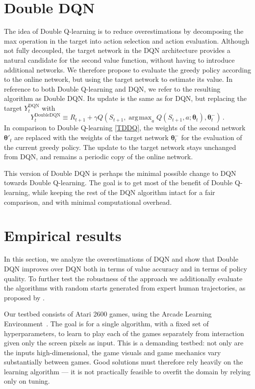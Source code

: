 \documentclass[letterpaper]{article}
\def\th{\bm\theta}
\def\g{\gamma}
\DeclareMathOperator*{\argmax}{\arg\!\max}
\begin{document}
\section{Double DQN}

The idea of Double Q-learning is to reduce overestimations by decomposing the max operation 
in the target into action selection and action evaluation.
Although not fully decoupled, the target network in the DQN architecture provides a natural candidate for the second value function, without having to introduce additional networks. 
We therefore propose to evaluate the greedy policy according to the online network, but using the target network to estimate its value.
In reference to both Double Q-learning and DQN, we refer to the resulting algorithm as Double DQN. 
Its update is the same as for DQN, but replacing the target $Y^{\text{DQN}}_t$ with
\[
Y^\text{DoubleDQN}_t \equiv R_{t+1} + \g Q( S_{t+1}, \argmax_a Q( S_{t+1}, a ; \th_t ), \th^-_t ) \,.
\]
In comparison to Double Q-learning \eqref{TDDQ}, the weights of the second network $\th'_t$ are replaced with the weights of the target network $\th^-_t$ for the evaluation of the current greedy policy.  The update to the target network stays unchanged from DQN, and remains a periodic copy of the online network.

This version of Double DQN is perhaps the minimal possible change to DQN towards Double Q-learning.  The goal is to get most of the benefit of Double Q-learning, while keeping the rest of the DQN algorithm intact for a fair comparison, and with minimal computational overhead.

\section{Empirical results}
\label{sec:results}

In this section, we analyze the overestimations of DQN and show that Double DQN improves over DQN both in terms of value accuracy and in terms of policy quality. To further test the robustness of the approach we additionally evaluate  the algorithms with random starts generated from expert human trajectories, as proposed by \citet{Nair:2015}.

Our testbed consists of Atari 2600 games, using the Arcade Learning Environment~\citep{Bellemare:2013}. The goal is for a single algorithm, with a fixed set of hyperparameters, to learn to play each of the games separately from interaction given only the screen pixels as input. 
This is a demanding testbed: not only are the inputs high-dimensional, the game visuals and game mechanics vary substantially between games. Good solutions must therefore rely heavily on the learning algorithm --- it is not practically feasible to overfit the domain by relying only on tuning.  
\end{document}
